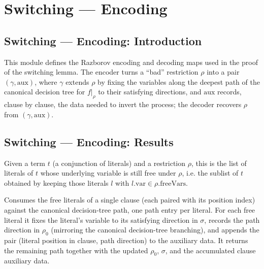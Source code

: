 \section{Switching --- Encoding}
\subsection*{Switching --- Encoding: Introduction}

This module defines the Razborov encoding and decoding maps used in the proof of
the switching lemma. The encoder turns a ``bad'' restriction $\rho$ into a pair
$(\gamma, \mathrm{aux})$, where $\gamma$ extends $\rho$ by fixing the variables
along the deepest path of the canonical decision tree for $f|_\rho$ to their
satisfying directions, and $\mathrm{aux}$ records, clause by clause, the data needed
to invert the process; the decoder recovers $\rho$ from $(\gamma, \mathrm{aux})$.

\subsection*{Switching --- Encoding: Results}

\begin{definition}
\label{SwitchingLemma.Term.freeLiterals}
\leanok
{}
Given a term $t$ (a conjunction of literals) and a restriction $\rho$, this is the list
of literals of $t$ whose underlying variable is still free under $\rho$, i.e. the
sublist of $t$ obtained by keeping those literals $l$ with $l.\mathrm{var} \in \rho.\mathrm{freeVars}$.
\end{definition}

\begin{definition}
\label{SwitchingLemma.processClauseLits}
\leanok
{}
Consumes the free literals of a single clause (each paired with its position index)
against the canonical decision-tree path, one path entry per literal. For each free
literal it fixes the literal's variable to its satisfying direction in $\sigma$,
records the path direction in $\rho_0$ (mirroring the canonical decision-tree
branching), and appends the pair (literal position in clause, path direction) to the
auxiliary data. It returns the remaining path together with the updated $\rho_0$,
$\sigma$, and the accumulated clause auxiliary data.
\end{definition}


